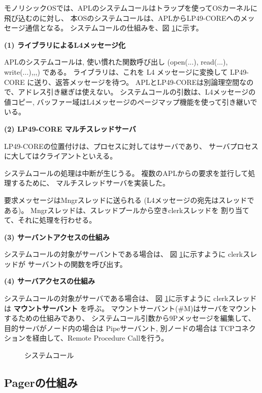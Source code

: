 \documentclass{jarticle}
\begin{document}
  モノリシックOSでは、APLのシステムコールはトラップを使ってOSカーネルに飛び込むのに対し、
本OSのシステムコールは、APLからLP49-COREへのメッセージ通信となる。
  システムコールの仕組みを、図 \ref{fig:LP49syscall}に示す。

{\bf (1) ライブラリによるL4メッセージ化}

   APLのシステムコールは, 使い慣れた関数呼び出し (open(...), read(...), write(...),,,) 
  である。
  ライブラリは、これを L4 メッセージに変換して LP49-CORE に送り、返答メッセージを待つ。
  APLとLP49-COREは別論理空間なので、アドレス引き継ぎは使えない。
  システムコールの引数は、L4メッセージの値コピー, 
  バッファー域はL4メッセージのページマップ機能を使って引き継いでいる。


{\bf (2) LP49-CORE マルチスレッドサーバ}

    LP49-COREの位置付けは、プロセスに対してはサーバであり、
    サーバプロセスに大してはクライアントといえる。

    システムコールの処理は中断が生じうる。
    複数のAPLからの要求を並行して処理するために、
    マルチスレッドサーバを実装した。

    要求メッセージはMngrスレッドに送られる
    (L4メッセージの宛先はスレッドである)。
    Mngrスレッドは、スレッドプールから空きclerkスレッドを
    割り当てて、それに処理を行わせる。


{\bf (3) サーバントアクセスの仕組み}
  
    システムコールの対象がサーバントである場合は、
    図 \ref{fig:LP49syscall}に示すように clerkスレッドが
    サーバントの関数を呼び出す。


{\bf (4) サーバアクセスの仕組み }

    システムコールの対象がサーバである場合は、
    図 \ref{fig:LP49syscall}に示すように
    clerkスレッドは {\bf マウントサーバント} を呼ぶ。
    マウントサーバント(\#M)はサーバをマウントするための仕組みであり、
   システムコール引数から9Pメッセージを編集して、
    目的サーバがノード内の場合は Pipeサーバント,
    別ノードの場合は TCPコネクションを経由して、Remote Procedure Callを行う。


\begin{figure}[htb]
  \begin{center}
   \epsfxsize=340pt
    \caption{システムコール}
    \label{fig:LP49syscall}
  \end{center}
\end{figure}


\subsection{Pagerの仕組み}
\end{document}
